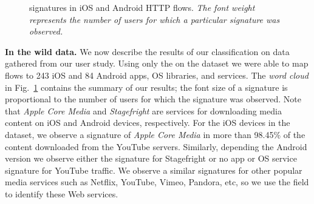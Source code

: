 \begin{figure}
\newline
{}
\caption{\useragent signatures in  iOS and Android HTTP flows. \emph{The font weight represents the number of users for which a particular signature was observed.}}
\vspace{\postfigspace}
\label{fig:http-wordcloud}
\end{figure}

\textbf{In the wild data.}
We now describe the results of our classification on data gathered from our user study.
Using only the \useragent on the \mobWild dataset we were able to map flows to 243 iOS and 84 Android apps, OS libraries, and services. 
The \emph{word cloud} in Fig.~\ref{fig:http-wordcloud} contains the summary of our results; the font size of a signature is proportional to the number of users for which the signature was observed.
Note that \emph{Apple Core Media} and \emph{Stagefright} are services for downloading media content on iOS and Android devices, respectively.
For the iOS devices in the \mobWild dataset, we observe a signature of \emph{Apple Core Media} in more than 98.45\% of the content downloaded from the YouTube servers.
Similarly, depending the Android version we observe either the signature for Stagefright or no app or OS service signature for YouTube traffic. %
We observe a similar signatures for other popular media services such as Netflix, YouTube, Vimeo, Pandora, etc, so we use the \httphost field to identify these Web services.

